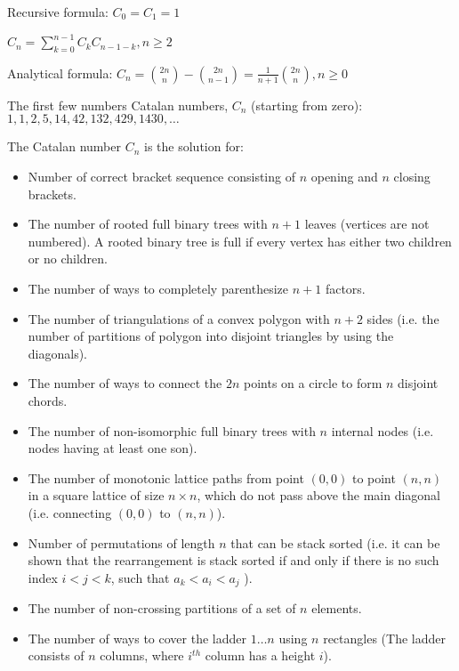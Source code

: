 Recursive formula:
$ C_0 = C_1 = 1 $

$ C_n = \sum_{k = 0}^{n-1} C_k C_{n-1-k} , {n} \geq 2 $

Analytical formula:
$ C_n = \binom{2n}{n} - \binom{2n}{n-1} = \frac{1}{n + 1} \binom{2n}{n} , {n} \geq 0 $

The first few numbers Catalan numbers, $C_n$ (starting from zero): $1, 1, 2, 5, 14, 42, 132, 429, 1430, \ldots$

The Catalan number $C_n$ is the solution for:
\begin{itemize}

  \item Number of correct bracket sequence consisting of $n$ opening and $n$ closing brackets.
  \item The number of rooted full binary trees with $n + 1$ leaves (vertices are not numbered). A rooted binary tree is full if every vertex has either two children or no children.
  \item The number of ways to completely parenthesize $n + 1$ factors.
  \item The number of triangulations of a convex polygon with $n + 2$ sides (i.e. the number of partitions of polygon into disjoint triangles by using the diagonals).
  \item The number of ways to connect the $2n$ points on a circle to form $n$ disjoint chords.
  \item The number of non-isomorphic full binary trees with $n$ internal nodes (i.e. nodes having at least one son).
  \item The number of monotonic lattice paths from point $(0, 0)$ to point $(n, n)$ in a square lattice of size $n \times n$, which do not pass above the main diagonal (i.e. connecting $(0, 0)$ to $(n, n)$).
  \item Number of permutations of length $n$ that can be stack sorted (i.e. it can be shown that the rearrangement is stack sorted if and only if there is no such index $i < j < k$, such that $a_k < a_i < a_j$ ).
  \item The number of non-crossing partitions of a set of $n$ elements.
  \item The number of ways to cover the ladder $1 \ldots n$ using $n$ rectangles (The ladder consists of $n$ columns, where $i^{th}$ column has a height $i$).
  
\end{itemize}